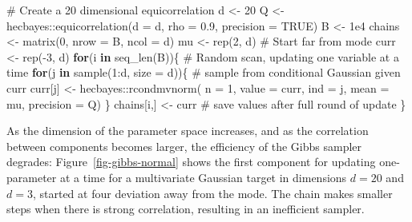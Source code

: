 \documentclass[
  11pt,
  letterpaper,
]{scrbook}
\newenvironment{Shaded}{\begin{snugshade}}{\end{snugshade}}
\newcommand{\AttributeTok}[1]{\textcolor[rgb]{0.40,0.45,0.13}{#1}}
\newcommand{\CommentTok}[1]{\textcolor[rgb]{0.37,0.37,0.37}{#1}}
\newcommand{\ConstantTok}[1]{\textcolor[rgb]{0.56,0.35,0.01}{#1}}
\newcommand{\ControlFlowTok}[1]{\textcolor[rgb]{0.00,0.23,0.31}{\textbf{#1}}}
\newcommand{\DecValTok}[1]{\textcolor[rgb]{0.68,0.00,0.00}{#1}}
\newcommand{\FloatTok}[1]{\textcolor[rgb]{0.68,0.00,0.00}{#1}}
\newcommand{\FunctionTok}[1]{\textcolor[rgb]{0.28,0.35,0.67}{#1}}
\newcommand{\NormalTok}[1]{\textcolor[rgb]{0.00,0.23,0.31}{#1}}
\newcommand{\OtherTok}[1]{\textcolor[rgb]{0.00,0.23,0.31}{#1}}
\newcommand{\SpecialCharTok}[1]{\textcolor[rgb]{0.37,0.37,0.37}{#1}}
\theoremstyle{definition}
\theoremstyle{definition}
\theoremstyle{definition}
\theoremstyle{plain}
\theoremstyle{plain}
\theoremstyle{remark}
\begin{document}
\begin{Shaded}
\begin{Highlighting}[]
\CommentTok{\# Create a 20 dimensional equicorrelation}
\NormalTok{d }\OtherTok{\textless{}{-}} \DecValTok{20}
\NormalTok{Q }\OtherTok{\textless{}{-}}\NormalTok{ hecbayes}\SpecialCharTok{::}\FunctionTok{equicorrelation}\NormalTok{(}\AttributeTok{d =}\NormalTok{ d, }\AttributeTok{rho =} \FloatTok{0.9}\NormalTok{, }\AttributeTok{precision =} \ConstantTok{TRUE}\NormalTok{)}
\NormalTok{B }\OtherTok{\textless{}{-}} \FloatTok{1e4}
\NormalTok{chains }\OtherTok{\textless{}{-}} \FunctionTok{matrix}\NormalTok{(}\DecValTok{0}\NormalTok{, }\AttributeTok{nrow =}\NormalTok{ B, }\AttributeTok{ncol =}\NormalTok{ d)}
\NormalTok{mu }\OtherTok{\textless{}{-}} \FunctionTok{rep}\NormalTok{(}\DecValTok{2}\NormalTok{, d)}
\CommentTok{\# Start far from mode}
\NormalTok{curr }\OtherTok{\textless{}{-}} \FunctionTok{rep}\NormalTok{(}\SpecialCharTok{{-}}\DecValTok{3}\NormalTok{, d)}
\ControlFlowTok{for}\NormalTok{(i }\ControlFlowTok{in} \FunctionTok{seq\_len}\NormalTok{(B))\{}
  \CommentTok{\# Random scan, updating one variable at a time}
  \ControlFlowTok{for}\NormalTok{(j }\ControlFlowTok{in} \FunctionTok{sample}\NormalTok{(}\DecValTok{1}\SpecialCharTok{:}\NormalTok{d, }\AttributeTok{size =}\NormalTok{ d))\{}
    \CommentTok{\# sample from conditional Gaussian given curr}
\NormalTok{    curr[j] }\OtherTok{\textless{}{-}}\NormalTok{ hecbayes}\SpecialCharTok{::}\FunctionTok{rcondmvnorm}\NormalTok{(}
      \AttributeTok{n =} \DecValTok{1}\NormalTok{, }
      \AttributeTok{value =}\NormalTok{ curr, }
      \AttributeTok{ind =}\NormalTok{ j, }
      \AttributeTok{mean =}\NormalTok{ mu, }
      \AttributeTok{precision =}\NormalTok{ Q)}
\NormalTok{  \}}
\NormalTok{  chains[i,] }\OtherTok{\textless{}{-}}\NormalTok{ curr }\CommentTok{\# save values after full round of update}
\NormalTok{\}}
\end{Highlighting}
\end{Shaded}

As the dimension of the parameter space increases, and as the
correlation between components becomes larger, the efficiency of the
Gibbs sampler degrades: Figure~\ref{fig-gibbs-normal} shows the first
component for updating one-parameter at a time for a multivariate
Gaussian target in dimensions \(d=20\) and \(d=3\), started at four
deviation away from the mode. The chain makes smaller steps when there
is strong correlation, resulting in an inefficient sampler.
\end{document}
